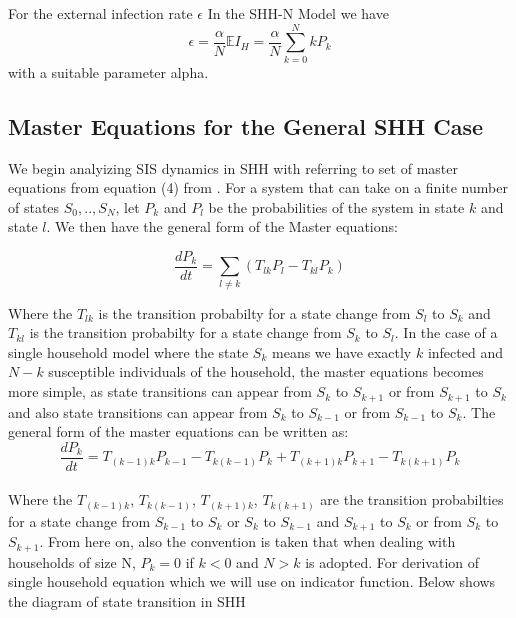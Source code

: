\documentclass[paper=a4, fontsize=11pt, twoside, BCOR=12mm, parskip=full, listof=totoc]{scrreprt}
\begin{document}
For the external infection rate $\epsilon$ In the SHH-N Model we have 
$$\epsilon=\frac{\alpha}{N}{\mathbb{E}I_H}=\frac{\alpha}{N}{\sum_{k=0}^N kP_k}$$
with a suitable parameter alpha.
\subsection*{Master Equations for the General SHH Case}
	We begin analyizing SIS dynamics in SHH with referring to set of master equations from equation (4) from \cite{holmes2022approximating}.  
	For a system that can take on a finite  number of states $S_0,..,S_N$, let $P_k$ and $P_l$ be the probabilities of the system in state $k$ and state $l$.
We then have the general form of the  Master equations\cite{masterequation}:

\begin{equation}
        \label{1stgeneral_discrete_master_equation1st}
\frac{dP_k}{dt} = \sum_{l \ne k} (T_{lk}P_l-T_{kl}P_k)  
\end{equation}

Where the $T_{lk}$ is the transition probabilty for a state change from $S_l$ to $S_k$ and $T_{kl}$ is the transition probabilty for a state change from $S_k$ to $S_l$.
In the case of a single household model where the state $S_k$ means we have exactly $k$ infected and $N-k$ susceptible individuals of the household, the master equations becomes more simple, as state transitions can appear from $S_k$ to $S_{k+1}$ or from $S_{k+1}$ to $S_{k}$ and also state transitions can appear from $S_k$ to $S_{k-1}$ or from $S_{k-1}$ to $S_{k}$.
%	
The general form of the  master equations can be written as:
\begin{equation}
	\label{general_discrete_master_equation} 
\frac{dP_k}{dt} =T_{(k-1)k}P_{k-1}-T_{k(k-1)}P_k+T_{(k+1)k}P_{k+1}-T_{k(k+1)}P_k 
\end{equation}  
\\	%
	Where the $T_{(k-1)k}$, $T_{k(k-1)}$, $T_{(k+1)k}$, $T_{k(k+1)}$ are the transition probabilties for a state change from $S_{k-1}$ to $S_k$ or $S_k$ to $S_{k-1}$ and $S_{k+1}$ to $S_k$ or from $S_k$ to $S_{k+1}$. From here on, also the convention is taken that when dealing with households of size N, $P_k=0$ if $k<0$ and $N>k$ is adopted. For derivation of single household equation which we will use on indicator function\cite{indicatorfunction}.
	Below shows the diagram of state transition in SHH
\end{document}
